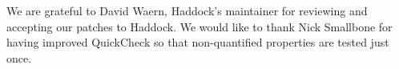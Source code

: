 \documentclass[preprint]{sigplanconf}
\begin{document}
\acks

We are grateful to David Waern, Haddock's maintainer for reviewing and
accepting our patches to Haddock.
We would like to thank
Nick Smallbone for having improved QuickCheck so that
non-quantified properties are tested just once.




\end{document}
